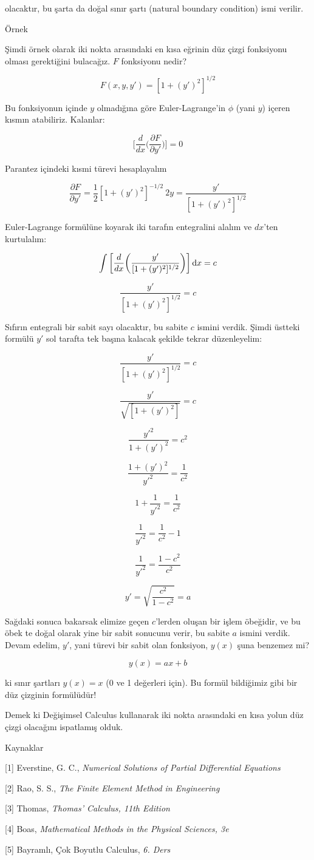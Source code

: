 \documentclass[12pt,fleqn]{article}\usepackage{../../common}
\begin{document}
olacaktır, bu şarta da doğal sınır şartı (natural boundary condition) ismi
verilir. 

Örnek

Şimdi örnek olarak iki nokta arasındaki en kısa eğrinin düz çizgi fonksiyonu
olması gerektiğini bulacağız. $F$ fonksiyonu nedir?

$$ F(x,y,y') = [1+(y')^2]^{1/2} $$

Bu fonksiyonun içinde $y$ olmadığına göre Euler-Lagrange'in $\phi$ (yani $y$)
içeren kısmın atabiliriz. Kalanlar:

$$ 
\bigg[
\frac{d}{dx} \bigg( \frac{\partial F}{\partial y'} \bigg)
\bigg] = 0
 $$

Parantez içindeki kısmi türevi hesaplayalım

$$
\frac{\partial F}{\partial y'}
= \frac{1}{2}[1+(y')^2]^{-1/2}\ 2y = \frac{y'}{[1+(y')^2]^{1/2}}
$$

Euler-Lagrange formülüne koyarak iki tarafın entegralini alalım ve $dx$'ten
kurtulalım:

$$ 
\int \bigg[
\frac{d}{dx} \bigg( \frac{y'}{[1+(y')^2]^{1/2}} \bigg)
\bigg] \,\mathrm{d} x = c 
$$

$$ \frac{y'}{[1+(y')^2]^{1/2}}  = c $$

Sıfırın entegrali bir sabit sayı olacaktır, bu sabite $c$ ismini verdik. Şimdi
üstteki formülü $y'$ sol tarafta tek başına kalacak şekilde tekrar düzenleyelim:

$$ \frac{y'}{[1+(y')^2]^{1/2}}  = c  $$

$$ \frac{y'}{\sqrt{[1+(y')^2]}}  = c  $$

$$ \frac{y'^2}{1+(y')^2}  = c^2 $$

$$ \frac{1+(y')^2}{y'^2}  = \frac{1}{c^2} $$

$$ 1+\frac{1}{y'^2} = \frac{1}{c^2}  $$

$$ \frac{1}{y'^2} = \frac{1}{c^2} - 1 $$

$$ \frac{1}{y'^2} = \frac{1-c^2}{c^2}  $$

$$ y' = \sqrt{\frac{c^2}{1-c^2}} = a $$

Sağdaki sonuca bakarsak elimize geçen $c$'lerden oluşan bir işlem öbeğidir, ve
bu öbek te doğal olarak yine bir sabit sonucunu verir, bu sabite $a$ ismini
verdik. Devam edelim, $y'$, yani türevi bir sabit olan fonksiyon, $y(x)$ şuna
benzemez mi?

$$ y(x) = ax + b $$

ki sınır şartları $y(x)=x$ (0 ve 1 değerleri için). Bu formül bildiğimiz
gibi bir düz çizginin formülüdür! 

Demek ki Değişimsel Calculus kullanarak iki nokta arasındaki en kısa yolun düz
çizgi olacağını ispatlamış olduk.

Kaynaklar

[1] Everstine, G. C., {\em Numerical Solutions of Partial Differential Equations}

[2] Rao, S. S., {\em The Finite Element Method in Engineering}

[3] Thomas, {\em Thomas' Calculus, 11th Edition}

[4] Boas, {\em Mathematical Methods in the Physical Sciences, 3e}

[5] Bayramlı, Çok Boyutlu Calculus, {\em 6. Ders}
\end{document}
